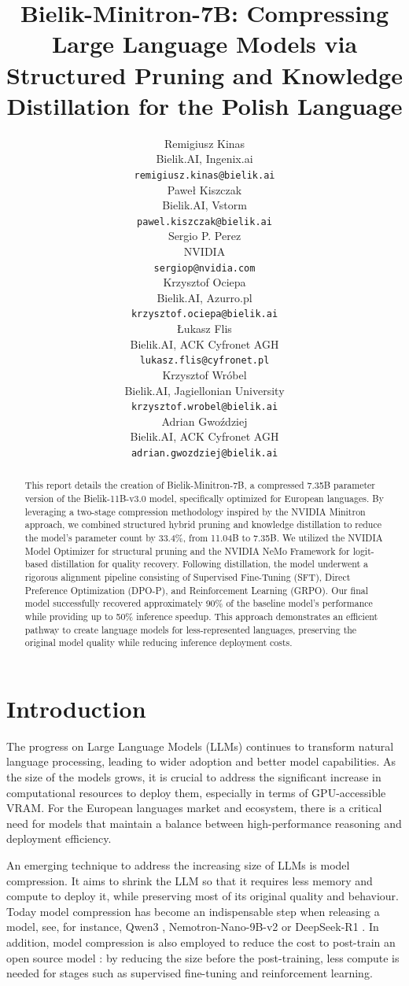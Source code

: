 \documentclass{article}
\title{Bielik-Minitron-7B: Compressing Large Language Models via Structured Pruning and Knowledge Distillation for the Polish Language}
\author{
  Remigiusz Kinas \\
  Bielik.AI, Ingenix.ai \\
  \texttt{remigiusz.kinas@bielik.ai} \\
  \And
  Paweł Kiszczak \\
  Bielik.AI, Vstorm \\
  \texttt{pawel.kiszczak@bielik.ai} \\
  \And
  Sergio P. Perez \\
  NVIDIA \\
  \texttt{sergiop@nvidia.com} \\
  \And
  Krzysztof Ociepa \\
  Bielik.AI, Azurro.pl \\
  \texttt{krzysztof.ociepa@bielik.ai} \\
  \And
  \L{}ukasz Flis \\
  Bielik.AI, ACK Cyfronet AGH \\
  \texttt{lukasz.flis@cyfronet.pl} \\
  \And
  Krzysztof Wr\'obel \\
  Bielik.AI, Jagiellonian University \\
  \texttt{krzysztof.wrobel@bielik.ai} \\
  \And
  Adrian Gwo\'zdziej \\
  Bielik.AI, ACK Cyfronet AGH \\
  \texttt{adrian.gwozdziej@bielik.ai} \\
}
\begin{document}
\maketitle

\begin{abstract}
This report details the creation of Bielik-Minitron-7B, a compressed 7.35B parameter version of the Bielik-11B-v3.0 model, specifically optimized for European languages. By leveraging a two-stage compression methodology inspired by the NVIDIA Minitron approach, we combined structured hybrid pruning and knowledge distillation to reduce the model's parameter count by 33.4\%, from 11.04B to 7.35B. We utilized the NVIDIA Model Optimizer for structural pruning and the NVIDIA NeMo Framework for logit-based distillation for quality recovery. Following distillation, the model underwent a rigorous alignment pipeline consisting of Supervised Fine-Tuning (SFT), Direct Preference Optimization (DPO-P), and Reinforcement Learning (GRPO). Our final model successfully recovered approximately 90\% of the baseline model's performance while providing up to 50\% inference speedup. This approach demonstrates an efficient pathway to create language models for less-represented languages, preserving the original model quality while reducing inference deployment costs.
\end{abstract}


\section{Introduction}
The progress on Large Language Models (LLMs) continues to transform natural language processing, leading to wider adoption and better model capabilities. As the size of the models grows, it is crucial to address the significant increase in computational resources to deploy them, especially in terms of GPU-accessible VRAM. For the European languages market and ecosystem, there is a critical need for models that maintain a balance between high-performance reasoning and deployment efficiency. 

An emerging technique to address the increasing size of LLMs is model compression. It aims to shrink the LLM so that it requires less memory and compute to deploy it, while preserving most of its original quality and behaviour. Today model compression has become an indispensable step when releasing a model, see, for instance, Qwen3 \cite{yang2025qwen3}, Nemotron-Nano-9B-v2 \cite{basant2025nvidia} or DeepSeek-R1 \cite{guo2025deepseek}. In addition, model compression is also employed to reduce the cost to post-train an open source model \cite{bercovich2025llama}: by reducing the size before the post-training, less compute is needed for stages such as supervised fine-tuning and reinforcement learning.
\end{document}
